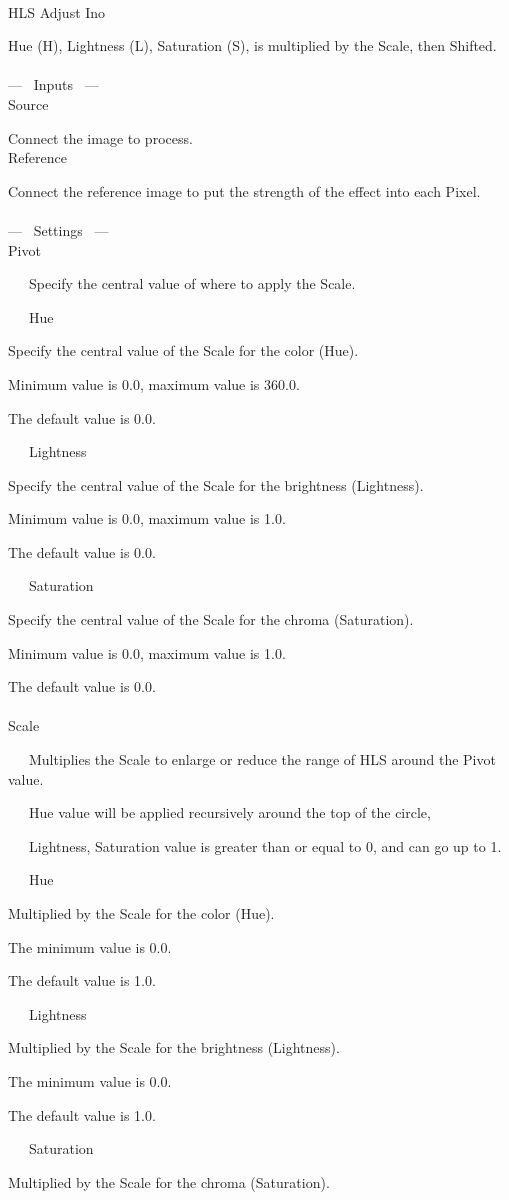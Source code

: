 \documentclass[a4paper,12pt]{article}
\begin{document}
\thispagestyle{empty}

\Large
\noindent \\
HLS Adjust Ino\medskip
\par
\normalsize
Hue (H), Lightness (L), Saturation (S), is multiplied by the Scale, then Shifted.\\
\\
--- \ Inputs \ ---\\
Source\par
Connect the image to process.\\
Reference\par
Connect the reference image to put the strength of the effect into each Pixel.\\
\\
--- \ Settings \ ---\\
Pivot\par
\noindent \ \ \, Specify the central value of where to apply the Scale.\\
\par
\noindent \ \ \, Hue\par
Specify the central value of the Scale for the color (Hue).\par
Minimum value is 0.0, maximum value is 360.0.\par
The default value is 0.0.\par
\noindent \ \ \, Lightness\par
Specify the central value of the Scale for the brightness (Lightness).\par
Minimum value is 0.0, maximum value is 1.0.\par
The default value is 0.0.\par
\noindent \ \ \, Saturation\par
Specify the central value of the Scale for the chroma (Saturation).\par
Minimum value is 0.0, maximum value is 1.0.\par
The default value is 0.0.\\
\\
Scale\par
\noindent \ \ \, Multiplies the Scale to enlarge or reduce the range of HLS around the Pivot value.\par
\noindent \ \ \, Hue value will be applied recursively around the top of the circle,\par
\noindent \ \ \, Lightness, Saturation value is greater than or equal to 0, and can go up to 1.\\
\par
\noindent \ \ \, Hue\par
Multiplied by the Scale for the color (Hue).\par
The minimum value is 0.0.\par
The default value is 1.0.\par
\noindent \ \ \, Lightness\par
Multiplied by the Scale for the brightness (Lightness).\par
The minimum value is 0.0.\par
The default value is 1.0.\par
\noindent \ \ \, Saturation\par
Multiplied by the Scale for the chroma (Saturation).
\end{document}
